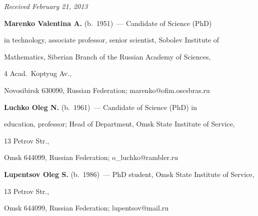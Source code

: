 \vspace*{-6pt}





\hfill{\small\textit{Received February 21, 2013}}










\Contr





\noindent


\textbf{Marenko Valentina A.} (b.\ 1951)~--- Candidate of Science (PhD)


in technology, associate professor, senior scientist, Sobolev Institute of


Mathematics, Siberian Branch of the Russian Academy of Sciences,


4 Acad.\ Koptyug Av., 


Novosibirsk 630090, Russian Federation; marenko@ofim.oscsbras.ru





\vspace*{3pt}





\noindent


\textbf{Luchko Oleg N.} (b.\ 1961)~--- Candidate of Science (PhD) in


education, professor; Head of Department, Omsk State Institute of Service,


13 Petrov Str., 


Omsk 644099, Russian Federation; o\_luchko@rambler.ru





\vspace*{3pt}





\noindent


\textbf{Lupentsov Oleg S.} (b.\ 1986)~--- PhD student, Omsk State Institute of Service,


13 Petrov Str., 


Omsk 644099, Russian Federation; lupentsov@mail.ru














 \label{end\stat}


 


\renewcommand{\bibname}{\protect\rm Литература}


